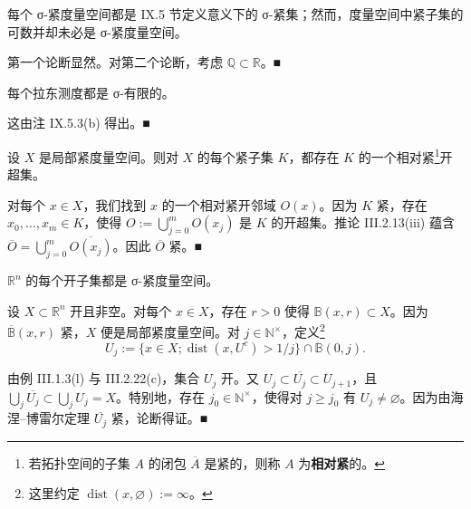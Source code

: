 \begin{remark}

\begin{items}
\item

每个 σ-紧度量空间都是 IX.5 节定义意义下的 σ-紧集；然而，度量空间中紧子集的可数并却未必是 σ-紧度量空间。

\proofhead
第一个论断显然。对第二个论断，考虑 $ \mathbb{Q} \subset \mathbb{R} $。\nobreak\hspace{0.35em}■
\item

每个拉东测度都是 σ-有限的。

\proofhead
这由注 IX.5.3(b) 得出。\nobreak\hspace{0.35em}■
\item

设 $ X $ 是局部紧度量空间。则对 $ X $ 的每个紧子集 $ K $，都存在 $ K $ 的一个相对紧\footnote{若拓扑空间的子集 $ A $ 的闭包 $ \overline{A} $ 是紧的，则称 $ A $ 为\textbf{相对紧}的。}开超集。

\proofhead
对每个 $ x \in X $，我们找到 $ x $ 的一个相对紧开邻域 $ O(x) $。因为 $ K $ 紧，存在 $ x_0,\ldots,x_m \in K $，使得 $ O := \bigcup_{j=0}^m O(x_j) $ 是 $ K $ 的开超集。推论 III.2.13(iii) 蕴含 $ \overline{O} = \bigcup_{j=0}^m \overline{O(x_j)} $。因此 $ \overline{O} $ 紧。\nobreak\hspace{0.35em}■
\item

$ \mathbb{R}^n $ 的每个开子集都是 σ-紧度量空间。

\proofhead
设 $ X \subset \mathbb{R}^n $ 开且非空。对每个 $ x \in X $，存在 $ r > 0 $ 使得 $ \mathbb{B}(x,r) \subset X $。因为 $ \overline{\mathbb{B}}(x,r) $ 紧，$ X $ 便是局部紧度量空间。对 $ j \in \mathbb{N}^\times $，定义\footnote{这里约定 $ \operatorname{dist}(x,\varnothing) := \infty $。}
\begin{equation}
U_j := \{ x \in X ; \operatorname{dist}(x,U^c) > 1/j \} \cap \mathbb{B}(0,j) .\tag{1.3}
\end{equation}

由例 III.1.3(l) 与 III.2.22(c)，集合 $ U_j $ 开。又 $ U_j \subset \overline{U_j} \subset U_{j+1} $，且 $ \bigcup_j \overline{U_j} \subset \bigcup_j U_j = X $。特别地，存在 $ j_0 \in \mathbb{N}^\times $，使得对 $ j \ge j_0 $ 有 $ U_j \ne \varnothing $。因为由海涅–博雷尔定理 $ \overline{U_j} $ 紧，论断得证。\nobreak\hspace{0.35em}■

\item


\end{items}
\end{remark}
